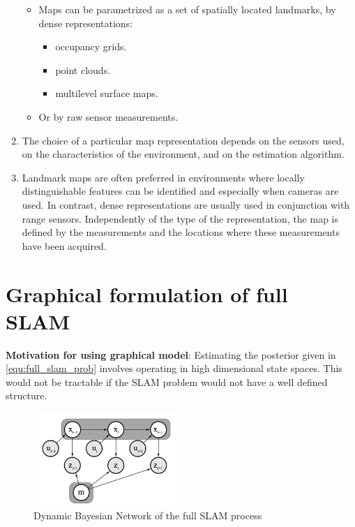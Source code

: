 \begin{enumerate}
\begin{itemize}
        \item Maps can be parametrized as a set of spatially located landmarks, by dense representations:
        \begin{itemize}
            \item occupancy grids.
            \item point clouds.
            \item multilevel surface maps.
        \end{itemize}
        \item Or by raw sensor measurements.
    \end{itemize}
    \item The choice of a particular map representation depends on the sensors used, on the characteristics of the environment, and on the estimation algorithm. 
    \item Landmark maps are often preferred in environments where locally distinguishable features can be identified and especially when cameras are used. In contrast, dense representations are usually used in conjunction with range sensors. Independently of the type of the representation, the map is defined by the measurements and the locations where these measurements have been acquired.
\end{enumerate}

\section{Graphical formulation of full SLAM}
\textbf{Motivation for using graphical model}: Estimating the posterior given in \ref{equ:full_slam_prob} involves operating in high dimensional state spaces. This would not be tractable if the SLAM problem would not have a well defined structure. 

\begin{figure}[htbp]
    \centering
    \includegraphics[width=0.5\textwidth]{figures/graph_slam/full_slam_graphical_model.png}
    \caption{Dynamic Bayesian Network of the full SLAM process}
    \label{fig:full_slam_dbn}
\end{figure}


